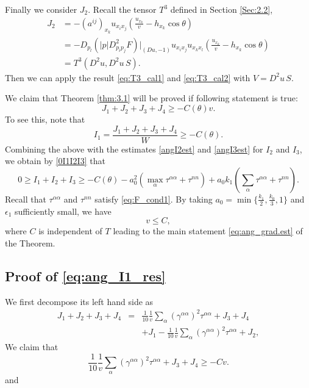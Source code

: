 \documentclass[12pt]{article}
\numberwithin{equation}{section}
\theoremstyle{plain}
\theoremstyle{definition}
\theoremstyle{remark}
\begin{document}
Finally we consider $J_2$. Recall the tensor $T^3$ defined in Section \ref{Sec:2.2},
\begin{equation}
\begin{split}
    J_2 & = - (a^{ij})_{x_k} u_{x_i x_j} \left(\frac{u_{x_k}}{v} - h_{x_k} \cos \theta \right) \\
    & = -D_{p_l} \left(|p| D^2_{p_i p_j} F \right)\Big|_{(Du,-1)} u_{x_i x_j} u_{x_k x_l} \left(\frac{u_{x_k}}{v} - h_{x_k} \cos \theta \right) \\
    & = T^3 (D^2 u , D^2 u\,S).
\end{split}
\end{equation}
Then we can apply the result \eqref{eq:T3_cal1} and \eqref{eq:T3_cal2} with $V = D^2 u\,S$.

We claim that Theorem \ref{thm:3.1} will be proved if  following statement is true:
\begin{equation}\label{eq:ang_I1_res}
J_1 + J_2 + J_3 + J_4 \geq -C(\theta) v.  
\end{equation}
To see this, note that
\begin{equation*}
    I_1 = \frac{J_1 + J_2 + J_3 + J_4}{W} \geq -C(\theta).
\end{equation*}
Combining the above with the estimates \eqref{angI2est} and \eqref{angI3est} for $I_2$ and $I_3$, we obtain by \eqref{0I1I2I3} that
\begin{equation*}
    0 \geq I_1 + I_2 + I_3 \geq -C(\theta) - a_0^2 \left(\max_{\alpha} \tau^{\alpha \alpha} + \tau^{n n} \right) + a_0 k_1 \left(\sum_{\alpha} \tau^{\alpha \alpha} + \tau^{n n} \right).
\end{equation*}
Recall that $\tau^{\alpha \alpha}$ and $\tau^{n n}$ satisfy \eqref{eq:F_cond1}. By taking $a_0 =\min \{\frac{k_1}{2},  \frac{k_0}{3}, 1 \}$ and $\epsilon_1$ sufficiently small, we have
\begin{equation*}
    v \leq C,
\end{equation*}
where $C$ is independent of $T$ leading to the main statement \eqref{eq:ang_grad.est} of the Theorem.

\subsection{Proof of \eqref{eq:ang_I1_res}}
We first decompose its left hand side as
\begin{eqnarray}
J_1 + J_2 + J_3 + J_4 
&=& 
\frac{1}{10} \frac{1}{v}  \sum_{\alpha} (\gamma^{\alpha \alpha})^2 \tau^{\alpha \alpha} + J_3 + J_4 \\
&& 
+ J_1 - \frac{1}{10} \frac{1}{v}  \sum_{\alpha} (\gamma^{\alpha \alpha})^2 \tau^{\alpha \alpha} +J_2,
\end{eqnarray}
We claim that 
     \begin{equation} \label{eq:ang_cl1}
         \frac{1}{10} \frac{1}{v}  \sum_{\alpha} (\gamma^{\alpha \alpha})^2 \tau^{\alpha \alpha} + J_3 + J_4 \geq -Cv.
     \end{equation}
and
\end{document}
